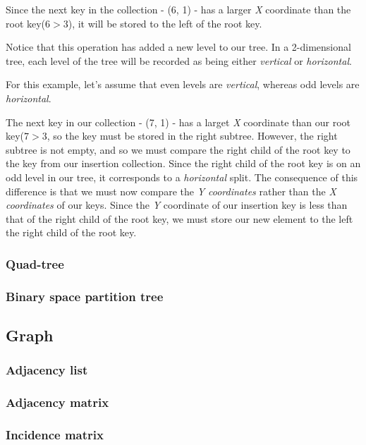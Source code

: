 \documentclass{article}
\begin{document}
Since the next key in the collection - (6, 1) - has a larger {\em X} coordinate than the root key(\(6 > 3\)), it will be stored to the left of the root key.

Notice that this operation has added a new level to our tree. In a 2-dimensional tree, each level of the tree will be recorded as being either {\em vertical} or {\em horizontal}.

For this example, let's assume that even levels are {\em vertical}, whereas odd levels are {\em horizontal}.

The next key in our collection - (7, 1) - has a larget {\em X} coordinate than our root key(\(7 > 3\), so the key must be stored in the right subtree. However, the right subtree is not empty, and so we must compare the right child of the root key to the key from our insertion collection. Since the right child of the root key is on an odd level in our tree, it corresponds to a {\em horizontal} split. The consequence of this difference is that we must now compare the {\em Y coordinates} rather than the {\em X coordinates} of our keys. Since the {\em Y} coordinate of our insertion key is less than that of the right child of the root key, we must store our new element to the left the right child of the root key.

\subsubsection{Quad-tree}
\subsubsection{Binary space partition tree}

\newpage

\subsection{Graph}

\subsubsection{Adjacency list}
\subsubsection{Adjacency matrix}
\subsubsection{Incidence matrix}
\end{document}
